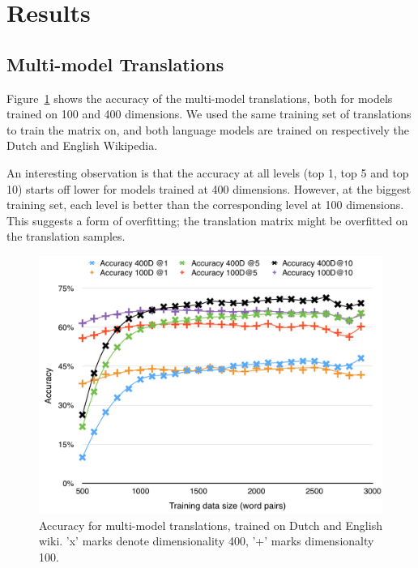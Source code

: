 \section{Results}
\label{sec:results}


\subsection{Multi-model Translations}
Figure~\ref{fig:accuracy_multi_model_wikis} shows the accuracy of the multi-model translations, both for models trained on 100 and 400 dimensions. We used the same training set of translations to train the matrix on, and both language models are trained on respectively the Dutch and English Wikipedia.

An interesting observation is that the accuracy at all levels (top 1, top 5 and top 10) starts off lower for models trained at 400 dimensions. However, at the biggest training set, each level is better than the corresponding level at 100 dimensions. This suggests a form of overfitting; the translation matrix might be overfitted on the translation samples.


\begin{figure}[ht!]
  \centering \includegraphics[width=\linewidth]{images/accuracy_multi_model_wikis}
  \caption{Accuracy for multi-model translations, trained on Dutch and English wiki. 'x' marks denote dimensionality 400, '+' marks dimensionalty 100.}
  \label{fig:accuracy_multi_model_wikis}
\end{figure}



